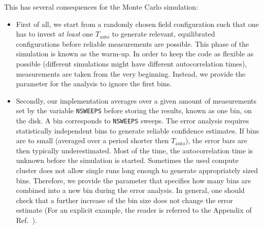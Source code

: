 This has several consequences for the Monte Carlo simulation:
\begin{itemize}
	\item First of all, we start from a randomly chosen field configuration such that one has to invest \textit{at least} one $T_\mathrm{auto}$ to generate relevant, equilibrated configurations before reliable measurements are possible. This phase of the simulation is known as the warm-up. In order to keep the code as flexible as possible (different simulations might have different autocorrelation times), measurements are taken from the very beginning. Instead, we provide the parameter  for the analysis to ignore the first  bins.
	\item Secondly, our implementation averages over a given amount of measurements   set by the variable \texttt{NSWEEPS}  before storing the results, known as one bin, on the disk.  A bin corresponds to \texttt{NSWEEPS}  sweeps. The  error analysis requires statistically  independent bins to generate reliable confidence estimates. If bins are to small (averaged over a period shorter then $T_\mathrm{auto}$), the error bars are then typically underestimated. Most of the time, the autocorrelation time is unknown before the simulation is started.  Sometimes the used compute cluster does not allow single runs long enough to generate appropriately sized bins. Therefore, we provide the  parameter that specifies how many bins are combined into a new bin during the error analysis. In general, one should check that a further increase of the bin size does not change the error estimate   (For an explicit example, the reader is referred to the Appendix of Ref.~\cite{Assaad02}).


\end{itemize}
